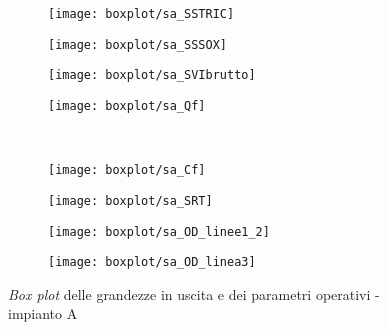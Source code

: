 \begin{figure}[h]
\begin{subfigure}{0.24\textwidth}
		\texttt{[image: boxplot/sa\_SSTRIC]}	\centering
	\end{subfigure}
	\begin{subfigure}{0.24\textwidth}
		\texttt{[image: boxplot/sa\_SSSOX]}	\centering
	\end{subfigure}
	\begin{subfigure}{0.24\textwidth}
		\texttt{[image: boxplot/sa\_SVIbrutto]}\centering
	\end{subfigure}
	\begin{subfigure}{0.24\textwidth}
		\texttt{[image: boxplot/sa\_Qf]}	\centering
	\end{subfigure}
	\\[1ex]
	\begin{subfigure}{0.24\textwidth}
		\texttt{[image: boxplot/sa\_Cf]}	\centering
	\end{subfigure}
	\begin{subfigure}{0.24\textwidth}
		\texttt{[image: boxplot/sa\_SRT]}	\centering
	\end{subfigure}
	\begin{subfigure}{0.24\textwidth}
		\texttt{[image: boxplot/sa\_OD\_linee1\_2]}	\centering
	\end{subfigure}
	\begin{subfigure}{0.24\textwidth}
		\texttt{[image: boxplot/sa\_OD\_linea3]}	\centering
	\end{subfigure}
	\caption{\textit{Box plot} delle grandezze in uscita e dei parametri operativi - impianto A}
	\label{fig:sa_boxplotout_parop}
\end{figure}


